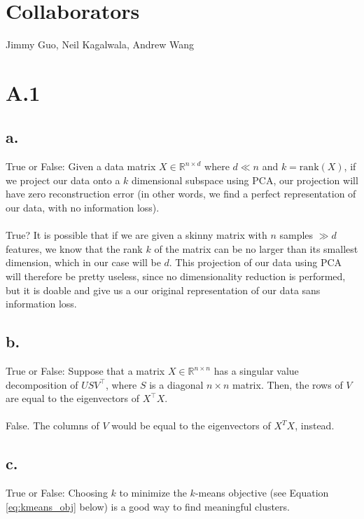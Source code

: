 \documentclass{article}
\date{{}}
\newcommand{\1}{\mathbf{1}}
\begin{document}
\thispagestyle{firstpageheader}

\section*{Collaborators}
{\Large 
Jimmy Guo, Neil Kagalwala, Andrew Wang
}
\section*{A.1}
{\Large 

\subsection*{a.}

True or False: Given a data matrix $X \in \mathbb{R}^{n \times d}$ where $d\ll n$ and $k = \mathrm{rank}(X)$, if we project our data onto a $k$ dimensional subspace using PCA, our projection will have zero reconstruction error (in other words, we find a perfect representation of our data, with no information loss). \\ \\

True? It is possible that if we are given a skinny matrix with $n$ samples $\gg d$ features, we know that the rank $k$ of the matrix can be no larger than its smallest dimension, which in our case will be $d$. This projection of our data using PCA will therefore be pretty useless, since no dimensionality reduction is performed, but it is doable and give us a our original representation of our data sans information loss. 

\subsection*{b.}

True or False: Suppose that a matrix $X\in \mathbb{R}^{n \times n}$ has a singular value decomposition of $USV^{\top}$, where $S$ is a diagonal $n \times n$ matrix. Then, the rows of $V$ are equal to the eigenvectors of $X^{\top}X$. \\ \\

False. The columns of $V$ would be equal to the eigenvectors of $X^T X$, instead.

\subsection*{c.}

True or False: Choosing $k$ to minimize the $k$-means objective (see Equation \eqref{eq:kmeans_obj} below) is a good way to find meaningful clusters. \\ \\

}
\end{document}
